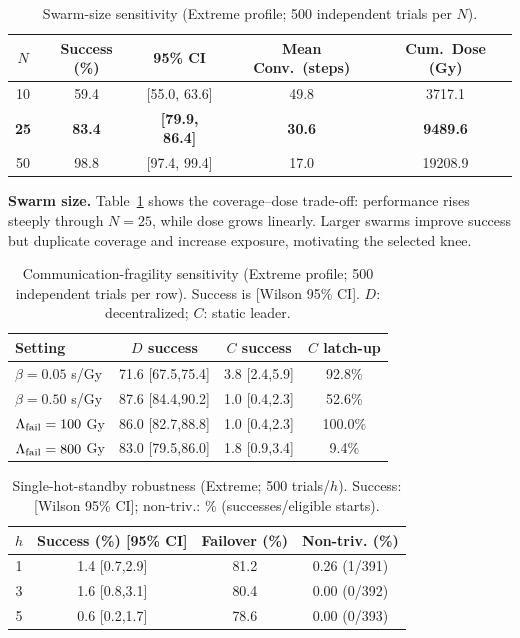 \documentclass[conference]{IEEEtran}
\begin{document}
\begin{table}[t]
\renewcommand{\arraystretch}{0.85}
\caption{Swarm-size sensitivity (Extreme profile; 500 independent trials per $N$).}
\label{tab:sweep-n}
\centering
\scriptsize
\setlength{\tabcolsep}{3pt}
\begin{tabular}{@{}c c c c c@{}}
\toprule
$N$ & Success (\%) & 95\% CI & Mean Conv.\ (steps) & Cum.\ Dose (Gy) \\
\midrule
10 & 59.4 & [55.0, 63.6] & 49.8 & 3717.1 \\
\textbf{25} & \textbf{83.4} & \textbf{[79.9, 86.4]} & \textbf{30.6} & \textbf{9489.6} \\
50 & 98.8 & [97.4, 99.4] & 17.0 & 19208.9 \\
\bottomrule
\end{tabular}

\end{table}

\textbf{Swarm size.} Table~\ref{tab:sweep-n} shows the coverage--dose trade-off: performance rises steeply through $N=25$, while dose grows linearly. Larger swarms improve success but duplicate coverage and increase exposure, motivating the selected knee.

\begin{table}[t]
\renewcommand{\arraystretch}{0.84}
\caption{Communication-fragility sensitivity (Extreme profile; 500 independent trials per row). Success is [Wilson 95\% CI]. $D$: decentralized; $C$: static leader.}
\label{tab:fragility}
\centering\scriptsize\setlength{\tabcolsep}{3pt}
\begin{tabular}{@{}lccc@{}}
\toprule Setting & $D$ success & $C$ success & $C$ latch-up \\\midrule
$\beta=0.05$ s/Gy & 71.6 [67.5,75.4] & 3.8 [2.4,5.9] & 92.8\% \\
$\beta=0.50$ s/Gy & 87.6 [84.4,90.2] & 1.0 [0.4,2.3] & 52.6\% \\
$\Lambda_{\rm fail}=100$ Gy & 86.0 [82.7,88.8] & 1.0 [0.4,2.3] & 100.0\% \\
$\Lambda_{\rm fail}=800$ Gy & 83.0 [79.5,86.0] & 1.8 [0.9,3.4] & 9.4\% \\
\bottomrule
\end{tabular}
\end{table}

\begin{table}[t]
\renewcommand{\arraystretch}{0.84}
\caption{Single-hot-standby robustness (Extreme; 500 trials/$h$). Success: [Wilson 95\% CI]; non-triv.: \% (successes/eligible starts).}
\label{tab:hot-standby}
\centering\scriptsize\setlength{\tabcolsep}{2.5pt}
\begin{tabular}{@{}cccc@{}}
\toprule
$h$ & Success (\%) [95\% CI] & Failover (\%) & Non-triv. (\%) \\
\midrule
1 & 1.4 [0.7,2.9] & 81.2 & 0.26 (1/391) \\
3 & 1.6 [0.8,3.1] & 80.4 & 0.00 (0/392) \\
5 & 0.6 [0.2,1.7] & 78.6 & 0.00 (0/393) \\
\bottomrule
\end{tabular}
\end{table}
\end{document}
